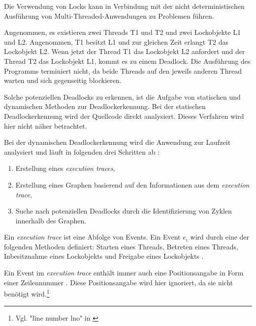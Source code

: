 Die Verwendung von Locks kann in Verbindung mit der nicht deterministischen
Ausführung von Multi-Threaded-Anwendungen zu Problemen führen.

Angenommen, es existieren zwei Threads \textrm{T1} und \textrm{T2} und zwei
Lockobjekte \textrm{L1} und \textrm{L2}. Angenommen, \textrm{T1} besitzt
\textrm{L1} und zur gleichen Zeit erlangt \textrm{T2} das Lockobjekt
\textrm{L2}. Wenn jetzt der Thread \textrm{T1} das Lockobjekt \textrm{L2}
anfordert und der Thread \textrm{T2} das Lockobjekt \textrm{L1}, kommt es zu
einem Deadlock.\autocite[vgl.][70]{coffman1971system} Die Ausführung des
Programms terminiert nicht, da beide Threads auf den jeweils anderen Thread
warten und sich gegenseitig blockieren.

Solche potenziellen Deadlocks zu erkennen, ist die Aufgabe von statischen und
dynamischen Methoden zur Deadlockerkennung. Bei der statischen Deadlockerkennung
wird der Quellcode direkt analysiert. Dieses Verfahren wird hier nicht näher
betrachtet.

Bei der dynamischen Deadlockerkennung wird die Anwendung zur Laufzeit analysiert
und läuft in folgenden drei Schritten ab
\autocite[vgl.][212-213]{bensalem2005dynamic}:
\begin{enumerate}
  \item Erstellung eines \emph{execution traces},
  \item Erstellung eines Graphen basierend auf den Informationen aus dem
  \emph{execution trace},
  \item Suche nach potenziellen Deadlocks durch die Identifizierung von Zyklen
  innerhalb des Graphen.
\end{enumerate}
Ein \emph{execution trace} ist eine Abfolge von Events. Ein Event \textrm{$e_i$}
wird durch eine der folgenden Methoden definiert: Starten eines Threads,
Betreten eines Threads, Inbesitznahme eines Lockobjekts und Freigabe eines
Lockobjekts \autocite[vgl.][212]{bensalem2005dynamic}.

Ein Event im \emph{execution trace} enthält immer auch eine Positionsangabe in
Form einer Zeilennummer \autocite[vgl.][212]{bensalem2005dynamic}. Diese
Positionsangabe  wird hier ignoriert, da sie nicht benötigt wird.\footnote{Vgl.
"line number lno" in \autocite[212]{bensalem2005dynamic}}

